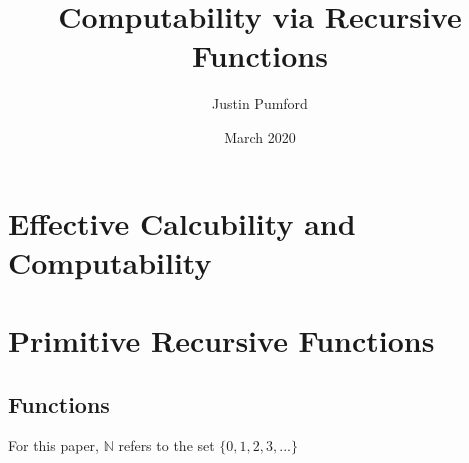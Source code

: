 \documentclass[12pt, letterpaper]{article}
\title{Computability via Recursive Functions}
\author{Justin Pumford  }
\date{March 2020}
\theoremstyle{case}
\begin{document}
  \maketitle

  \section{Effective Calcubility and Computability}

  \section{Primitive Recursive Functions}
    \subsection{Functions}
      For this paper, $\mathbb{N}$ refers to the set $\{0, 1, 2, 3, ...\}$
\end{document}
